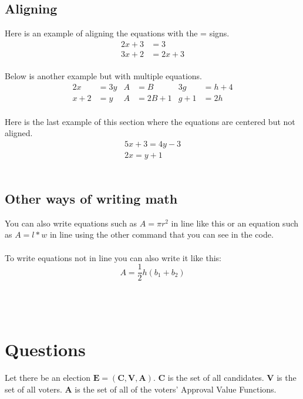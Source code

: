 \documentclass{article}
\begin{document}
\subsection{Aligning}

Here is an example of aligning the equations with the = signs.
\begin{align*} 
2x+3&=3\\
3x+2&=2x+3
\end{align*}\\

Below is another example but with multiple equations.
\begin{align*}
2x&=3y  &   A&=B    &   3g&=h+4 \\
x+2&=y  &   A&=2B+1 &   g+1&=2h
\end{align*}\\

Here is the last example of this section where the equations are centered but not aligned.
\begin{gather*} 
5x+3=4y-3 \\
2x=y+1 
\end{gather*}\\


\subsection{Other ways of writing math}
You can also write equations such as \(A=\pi r^2\) in line like this or an equation such as $A=l*w$ in line using the other command that you can see in the code.\\\\

To write equations not in line you can also write it like this: \[A=\frac{1}{2}h(b_1+b_2)\]\\\\\\

\section{Questions}

Let there be an election $\boldsymbol{E} = (\boldsymbol{C}, \boldsymbol{V}, \boldsymbol{A})$.
$\boldsymbol{C}$ is the set of all candidates.
$\boldsymbol{V}$ is the set of all voters.
$\boldsymbol{A}$ is the set of all of the voters' Approval Value Functions.\\
\end{document}
